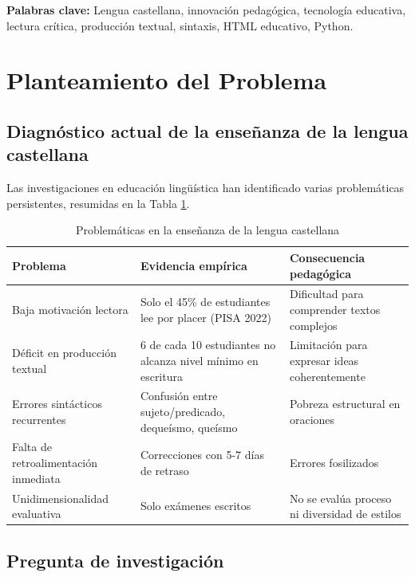 \documentclass[12pt,spanish]{article}
\begin{document}
\textbf{Palabras clave:} Lengua castellana, innovación pedagógica, tecnología educativa, lectura crítica, producción textual, sintaxis, HTML educativo, Python.

\newpage

\tableofcontents
\newpage

\section{Planteamiento del Problema}

\subsection{Diagnóstico actual de la enseñanza de la lengua castellana}

Las investigaciones en educación lingüística han identificado varias problemáticas persistentes, resumidas en la Tabla \ref{tab:problemas}.

\begin{table}[H]
\centering
\caption{Problemáticas en la enseñanza de la lengua castellana}
\label{tab:problemas}
\begin{tabular}{|p{4cm}|p{6cm}|p{4cm}|}
\hline
\textbf{Problema} & \textbf{Evidencia empírica} & \textbf{Consecuencia pedagógica} \\
\hline
Baja motivación lectora & Solo el 45\% de estudiantes lee por placer (PISA 2022) & Dificultad para comprender textos complejos \\
\hline
Déficit en producción textual & 6 de cada 10 estudiantes no alcanza nivel mínimo en escritura & Limitación para expresar ideas coherentemente \\
\hline
Errores sintácticos recurrentes & Confusión entre sujeto/predicado, dequeísmo, queísmo & Pobreza estructural en oraciones \\
\hline
Falta de retroalimentación inmediata & Correcciones con 5-7 días de retraso & Errores fosilizados \\
\hline
Unidimensionalidad evaluativa & Solo exámenes escritos & No se evalúa proceso ni diversidad de estilos \\
\hline
\end{tabular}
\end{table}

\subsection{Pregunta de investigación}
\end{document}
